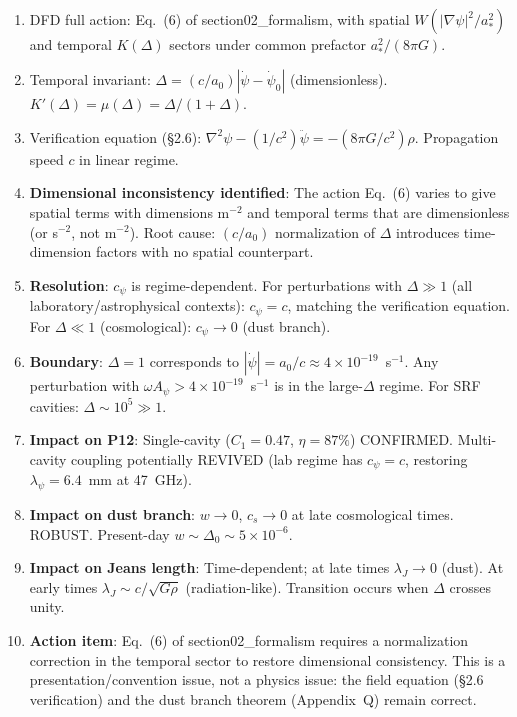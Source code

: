 \documentclass[11pt]{article}
\newcommand{\ee}[1]{\times 10^{#1}}
\begin{document}
\begin{enumerate}
\item DFD full action: Eq.~(6) of section02\_formalism, with spatial
  $W(|\nabla\psi|^2/a_*^2)$ and temporal $K(\Delta)$ sectors under
  common prefactor $a_*^2/(8\pi G)$.
\item Temporal invariant: $\Delta = (c/a_0)|\dot\psi - \dot\psi_0|$
  (dimensionless). $K'(\Delta) = \mu(\Delta) = \Delta/(1+\Delta)$.
\item Verification equation (\S2.6): $\nabla^2\psi - (1/c^2)\ddot\psi
  = -(8\pi G/c^2)\rho$. Propagation speed $c$ in linear regime.
\item \textbf{Dimensional inconsistency identified}: The action Eq.~(6)
  varies to give spatial terms with dimensions m$^{-2}$ and temporal
  terms that are dimensionless (or s$^{-2}$, not m$^{-2}$). Root cause:
  $(c/a_0)$ normalization of $\Delta$ introduces time-dimension factors
  with no spatial counterpart.
\item \textbf{Resolution}: $c_\psi$ is regime-dependent. For perturbations
  with $\Delta \gg 1$ (all laboratory/astrophysical contexts): $c_\psi = c$,
  matching the verification equation. For $\Delta \ll 1$ (cosmological):
  $c_\psi \to 0$ (dust branch).
\item \textbf{Boundary}: $\Delta = 1$ corresponds to
  $|\dot\psi| = a_0/c \approx 4\ee{-19}$~s$^{-1}$. Any perturbation
  with $\omega A_\psi > 4\ee{-19}$~s$^{-1}$ is in the large-$\Delta$
  regime. For SRF cavities: $\Delta \sim 10^5 \gg 1$.
\item \textbf{Impact on P12}: Single-cavity ($C_1 = 0.47$, $\eta = 87\%$)
  CONFIRMED. Multi-cavity coupling potentially REVIVED (lab regime
  has $c_\psi = c$, restoring $\lambda_\psi = 6.4$~mm at 47~GHz).
\item \textbf{Impact on dust branch}: $w \to 0$, $c_s \to 0$ at late
  cosmological times. ROBUST. Present-day $w \sim \Delta_0 \sim 5\ee{-6}$.
\item \textbf{Impact on Jeans length}: Time-dependent; at late times
  $\lambda_J \to 0$ (dust). At early times $\lambda_J \sim c/\sqrt{G\rho}$
  (radiation-like). Transition occurs when $\Delta$ crosses unity.
\item \textbf{Action item}: Eq.~(6) of section02\_formalism requires
  a normalization correction in the temporal sector to restore dimensional
  consistency. This is a presentation/convention issue, not a physics issue:
  the field equation (\S2.6 verification) and the dust branch theorem
  (Appendix~Q) remain correct.
\end{enumerate}
\end{document}
